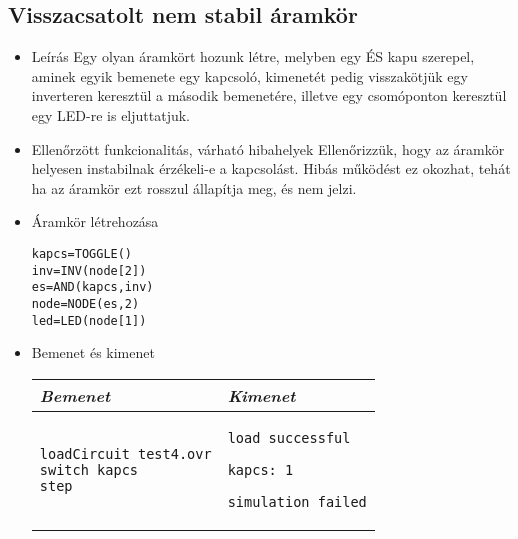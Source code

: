 \subsection{Visszacsatolt nem stabil áramkör}
\begin{itemize}
\item Leírás\newline
Egy olyan áramkört hozunk létre, melyben egy ÉS kapu szerepel, aminek egyik bemenete egy kapcsoló, kimenetét pedig visszakötjük egy inverteren keresztül a második bemenetére, illetve egy csomóponton keresztül egy LED-re is eljuttatjuk.
\item Ellenőrzött funkcionalitás, várható hibahelyek\newline
Ellenőrizzük, hogy az áramkör helyesen instabilnak érzékeli-e a kapcsolást. Hibás működést ez okozhat, tehát ha az áramkör ezt rosszul állapítja meg, és nem jelzi.

\item Áramkör létrehozása

\begin{verbatim}
kapcs=TOGGLE()
inv=INV(node[2])
es=AND(kapcs,inv)
node=NODE(es,2)
led=LED(node[1])
\end{verbatim}

\item Bemenet és kimenet\newline

\begin{tabular}{|p{7cm}|p{7cm}|} 
\hline 
\textit{Bemenet} & \textit{Kimenet} \\ \hline
\begin{verbatim}
loadCircuit test4.ovr
switch kapcs
step
\end{verbatim}
& 
\begin{verbatim}
load successful

kapcs: 1

simulation failed
\end{verbatim}
\\ \hline
\end{tabular}

\end{itemize}


